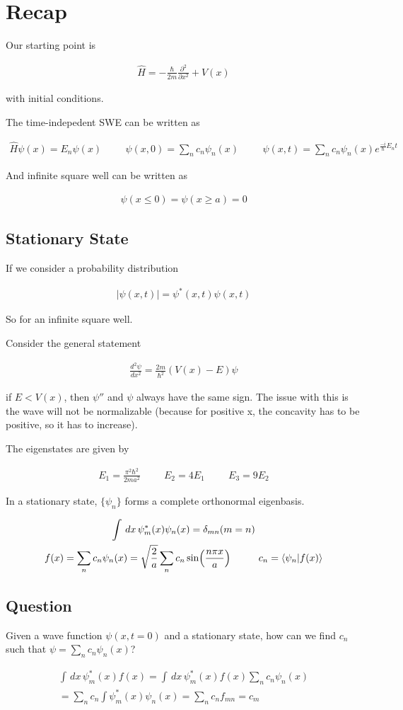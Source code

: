 \documentclass[fleqn]{report}
\newcommand{\hp}{\hspace{1cm}}
\newcommand{\del}{\partial}
\newcommand{\equations} [1] {
\begin{gather*}
#1
\end{gather*}
}
\begin{document}
\section{Recap}
Our starting point is 
\equations{
    \hat H 
    =
    - \frac{\hbar}{2 m}
    \frac{\del^2}{\del x^2}
    +
    V(x)
}
with initial conditions. 

The time-indepedent SWE can be written as 
\equations{
    \hat H \psi(x)
    =
    E_n \psi(x)
    \hp 
    \psi(x, 0) 
    =
    \sum_n c_n \psi_n(x) 
    \hp 
    \psi(x, t) 
    =
    \sum_n c_n \psi_n(x) 
    e^{\frac{-i}{\hbar} E_n t}
}

And infinite square well can be written as 
\equations{
    \psi(x \leq 0) = \psi(x \geq a) = 0 
}

\subsection{Stationary State}
If we consider a probability distribution 
\equations{
    |\psi(x, t)|
    =
    \psi^*(x, t) \psi(x, t)
}
So for an infinite square well. 

Consider the general statement 
\equations{
    \frac{d^2 \psi}{dx^2}
    =
    \frac{2m}{\hbar^2}
    (V(x) - E) \psi
}
if $E < V(x)$, then $\psi''$ and $\psi$ always have the same 
sign. The issue with this is the wave will not be normalizable
(because for positive x, the concavity has to be positive, so it has to increase).

The eigenstates are given by 
\equations{
    E_1
    =
    \frac{\pi^2 \hbar^2}{2 m a^2}
    \hp 
    E_2 = 4 E_1
    \hp
    E_3 = 9 E_2
}

In a stationary state, $\{ \psi_n\}$ forms a complete orthonormal eigenbasis. 
\equations{
    \int \, dx \, 
    \psi^*_m(x)
    \psi_n(x)
    =
    \delta_{mn}(m = n)
    \\
    f(x)
    =
    \sum_n c_n \psi_n(x)
    =
    \sqrt{\frac{2}{a}} 
    \sum_n c_n \sin(\frac{n \pi x}{a})
    \hp 
    c_n = \bra{\psi_n} \ket{f(x)}
}
\subsection*{Question} Given a wave function $\psi(x, t=0)$ 
and a stationary state, how can we find $c_n$ such that 
$\psi = \sum_n c_n \psi_n(x)$?
\equations{
    \int \, dx \, 
    \psi^*_m(x) f(x)
    =
    \int \, dx \, 
    \psi^*_m(x) f(x)
    \sum_n c_n \psi_n(x)
    \\
    =
    \sum_n c_n 
    \int 
    \psi^*_m(x)
    \psi_n(x)
    =
    \sum_n 
    c_n f_{mn}
    =
    c_m
}
\end{document}
